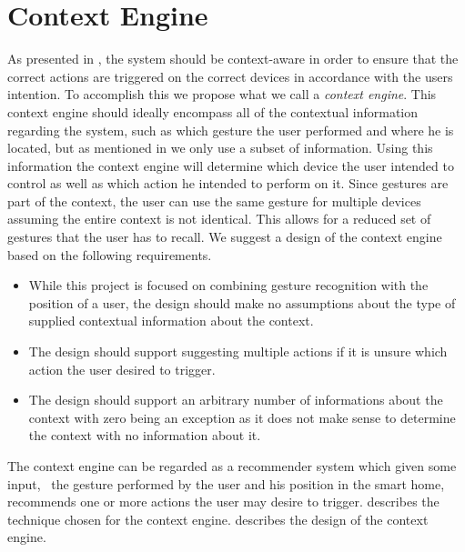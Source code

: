 \section{Context Engine}
\label{sec:analysis:context-engine}

As presented in , the system should be context-aware in order to ensure that the correct actions are triggered on the correct devices in accordance with the users intention.
To accomplish this we propose what we call a \emph{context engine}.
This context engine should ideally encompass all of the contextual information regarding the system, such as which gesture the user performed and where he is located, but as mentioned in  we only use a subset of information. 
Using this information the context engine will determine which device the user intended to control as well as which action he intended to perform on it.
Since gestures are part of the context, the user can use the same gesture for multiple devices assuming the entire context is not identical.
This allows for a reduced set of gestures that the user has to recall.
We suggest a design of the context engine based on the following requirements.

\begin{itemize}
\item While this project is focused on combining gesture recognition with the position of a user, the design should make no assumptions about the type of supplied contextual information about the context.
\item The design should support suggesting multiple actions if it is unsure which action the user desired to trigger.
\item The design should support an arbitrary number of informations about the context with zero being an exception as it does not make sense to determine the context with no information about it.
\end{itemize}

The context engine can be regarded as a recommender system which given some input, \eg~the gesture performed by the user and his position in the smart home, recommends one or more actions the user may desire to trigger.  describes the technique chosen for the context engine.  describes the design of the context engine.

